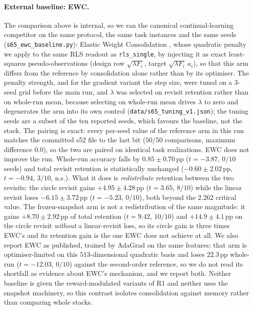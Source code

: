 \documentclass[preprint,12pt]{elsarticle}
\begin{document}
\paragraph{External baseline: EWC.} The comparison above is internal, so we ran
the canonical continual-learning competitor on the same protocol, the same
task instances and the same seeds (\texttt{s65\_ewc\_baseline.py}): Elastic
Weight Consolidation \cite{kirkpatrick2017}, whose quadratic penalty we apply
to the same RLS readout as \texttt{rls\_single}, by injecting it as exact
least-squares pseudo-observations (design row $\sqrt{\lambda F_i}$, target
$\sqrt{\lambda F_i}\,a_i$), so that this arm differs from the reference by
consolidation alone rather than by its optimiser. The penalty strength, and
for the gradient variant the step size, were tuned on a $3$-seed grid before
the main run, and $\lambda$ was selected on revisit retention rather than on
whole-run mean, because selecting on whole-run mean drives $\lambda$ to zero
and degenerates the arm into its own control
(\texttt{data/s65\_tuning\_v1.json}); the tuning seeds are a subset of the ten
reported seeds, which favours the baseline, not the stack. The pairing is
exact: every per-seed value of the reference arm in this run matches the
committed s52 file to the last bit ($50/50$ comparisons, maximum difference
$0.0$), so the two are paired on identical task realizations. EWC does not
improve the run. Whole-run accuracy falls by $0.85\pm0.70$\,pp ($t=-3.87$,
$0/10$ seeds) and total revisit retention is statistically unchanged
($-0.60\pm2.02$\,pp, $t=-0.94$, $3/10$, n.s.). What it does is
\emph{redistribute} retention between the two revisits: the circle revisit
gains $+4.95\pm4.28$\,pp ($t=3.65$, $8/10$) while the linear revisit loses
$-6.15\pm3.72$\,pp ($t=-5.23$, $0/10$), both beyond the $2.262$ critical
value. The frozen-snapshot arm is not a redistribution of the same magnitude:
it gains $+8.70\pm2.92$\,pp of total retention ($t=9.42$, $10/10$) and
$+14.9\pm4.1$\,pp on the circle revisit \emph{without} a linear-revisit loss,
so its circle gain is three times EWC's and its retention gain is the one EWC
does not achieve at all. We also report EWC as published, trained by AdaGrad
on the same features: that arm is optimiser-limited on this $513$-dimensional
quadratic basis and loses $22.3$\,pp whole-run ($t=-12.03$, $0/10$) against
the second-order reference, so we do not read its shortfall as evidence about
EWC's mechanism, and we report both. Neither baseline is given the
reward-modulated variants of R1 and neither uses the snapshot machinery, so
this contrast isolates consolidation against memory rather than comparing
whole stacks.
\end{document}
